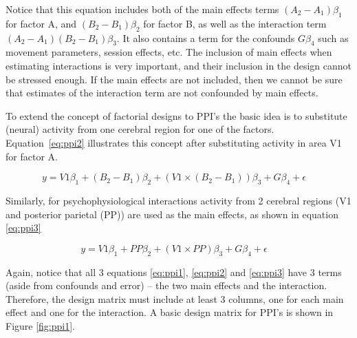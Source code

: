 Notice that this equation includes both of the main effects  terms $(A_{2}-A_{1})\beta_{1}$ for factor A, and $(B_{2}-B_{1})\beta_{2}$ for factor B, as well as the interaction term $(A_{2}-A_{1})(B_{2}-B_{1})\beta_{3}$. It also contains a term for the confounds $G\beta_{4}$ such as movement parameters, session effects, etc. The inclusion of main effects when estimating interactions is very important, and their inclusion in the design cannot be stressed enough. If the main effects are not included, then we cannot be sure that estimates of the interaction term are not confounded by main effects.

To extend the concept of factorial designs to PPI's the basic idea is to substitute (neural) activity from one cerebral region for one of the factors. Equation~\ref{eq:ppi2} illustrates this concept after substituting activity in area V1 for factor A.

\begin{equation}
	\mbox{$y=V1\beta_{1}+(B_{2}-B_{1})\beta_2+(V1\times(B_{2}-B_{1}))\beta_3+G\beta_4 +\epsilon\quad$}
	\label{eq:ppi2}
\end{equation}

Similarly, for psychophysiological interactions activity from 2 cerebral regions (V1 and posterior parietal (PP)) are used as the main effects, as shown in equation \ref{eq:ppi3}

\begin{equation}
	\mbox{$y=V1\beta_{1}+PP\beta_2+(V1\times PP)\beta_3+G\beta_4 +\epsilon\quad$}
	\label{eq:ppi3}
\end{equation}

Again, notice that all 3 equations \ref{eq:ppi1}, \ref{eq:ppi2} and \ref{eq:ppi3} have 3 terms (aside from confounds and error) -- the two main effects and the interaction. Therefore, the design matrix must include at least 3 columns, one for each main effect and one for the interaction. A basic design matrix for PPI's is shown in Figure \ref{fig:ppi1}.

